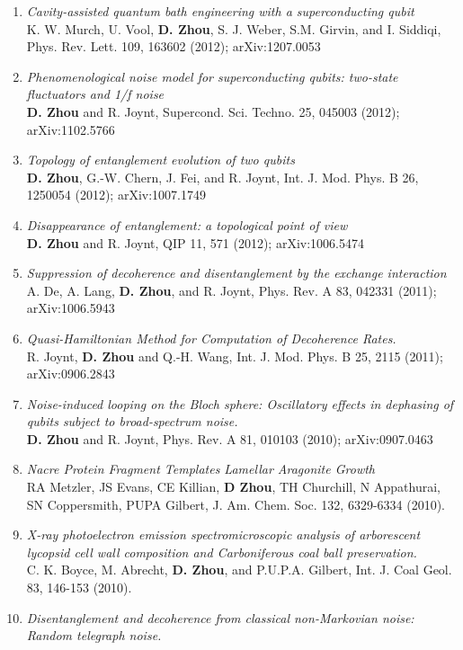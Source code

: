 \documentclass[centered,11pt,overlapped]{res}
\begin{document}
\begin{resume}
{\begin{enumerate}[leftmargin=-0.02in]
\item{\em Cavity-assisted quantum bath engineering with a superconducting qubit}\\
K. W. Murch, U. Vool, {\bf D. Zhou}, S. J. Weber, S.M. Girvin, and I. Siddiqi,
Phys. Rev. Lett. 109, 163602 (2012); arXiv:1207.0053
\item{\em Phenomenological noise model for superconducting qubits:
two-state fluctuators and 1/f noise}\\
{\bf D. Zhou} and R. Joynt, Supercond. Sci. Techno. 25, 045003 (2012); arXiv:1102.5766
\item{\em Topology of entanglement evolution of two qubits}\\
{\bf D. Zhou}, G.-W. Chern, J. Fei, and R. Joynt, Int. J. Mod. Phys. B 26, 1250054 (2012); arXiv:1007.1749
\item{\em Disappearance of entanglement: a topological point of view} \\
{\bf D. Zhou} and R. Joynt, QIP 11, 571 (2012); arXiv:1006.5474
\item{\em Suppression of decoherence and disentanglement by the exchange interaction}\\
A. De, A. Lang, {\bf D. Zhou}, and R. Joynt, Phys. Rev. A 83, 042331 (2011); arXiv:1006.5943
\item {\em Quasi-Hamiltonian Method for Computation of Decoherence Rates.}\\
R. Joynt, {\bf D. Zhou} and Q.-H. Wang, Int. J. Mod. Phys. B 25, 2115 (2011); arXiv:0906.2843
\item {\em Noise-induced looping on the Bloch sphere: Oscillatory effects in dephasing of qubits subject to broad-spectrum noise.}\\
{\bf D. Zhou} and R. Joynt, Phys. Rev. A 81, 010103 (2010); arXiv:0907.0463
\item {\em Nacre Protein Fragment Templates Lamellar Aragonite Growth}\\
RA Metzler, JS Evans, CE Killian, {\bf D Zhou}, TH Churchill, N Appathurai, SN Coppersmith, PUPA Gilbert, J. Am. Chem. Soc. 132, 6329-6334 (2010).
\item {\em X-ray photoelectron emission spectromicroscopic analysis of arborescent lycopsid cell wall composition and Carboniferous coal ball preservation.}\\
C. K. Boyce, M. Abrecht, {\bf D. Zhou}, and P.U.P.A. Gilbert, Int. J. Coal Geol. 83, 146-153 (2010).
\item {\em Disentanglement and decoherence from classical non-Markovian noise: Random telegraph noise.}\\

\end{enumerate}}
\end{resume}
\end{document}
